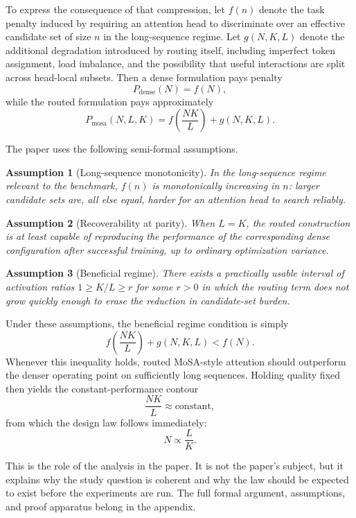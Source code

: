 \documentclass[11pt]{article}
\newtheorem{assumption}{Assumption}
\begin{document}
To express the consequence of that compression, let $f(n)$ denote the task penalty induced by requiring an attention head to discriminate over an effective candidate set of size $n$ in the long-sequence regime. Let $g(N,K,L)$ denote the additional degradation introduced by routing itself, including imperfect token assignment, load imbalance, and the possibility that useful interactions are split across head-local subsets. Then a dense formulation pays penalty
\[
P_{\mathrm{dense}}(N) = f(N),
\]
while the routed formulation pays approximately
\[
P_{\mathrm{mosa}}(N,L,K) = f\!\left(\frac{NK}{L}\right) + g(N,K,L).
\]

The paper uses the following semi-formal assumptions.

\begin{assumption}[Long-sequence monotonicity]
In the long-sequence regime relevant to the benchmark, $f(n)$ is monotonically increasing in $n$: larger candidate sets are, all else equal, harder for an attention head to search reliably.
\end{assumption}

\begin{assumption}[Recoverability at parity]
When $L=K$, the routed construction is at least capable of reproducing the performance of the corresponding dense configuration after successful training, up to ordinary optimization variance.
\end{assumption}

\begin{assumption}[Beneficial regime]
There exists a practically usable interval of activation ratios $1 \ge K/L \ge r$ for some $r > 0$ in which the routing term does not grow quickly enough to erase the reduction in candidate-set burden.
\end{assumption}

Under these assumptions, the beneficial regime condition is simply
\[
f\!\left(\frac{NK}{L}\right) + g(N,K,L) < f(N).
\]
Whenever this inequality holds, routed MoSA-style attention should outperform the denser operating point on sufficiently long sequences. Holding quality fixed then yields the constant-performance contour
\[
\frac{NK}{L} \approx \text{constant},
\]
from which the design law follows immediately:
\[
N \propto \frac{L}{K}.
\]

This is the role of the analysis in the paper. It is not the paper's subject, but it explains why the study question is coherent and why the law should be expected to exist before the experiments are run. The full formal argument, assumptions, and proof apparatus belong in the appendix.
\end{document}

